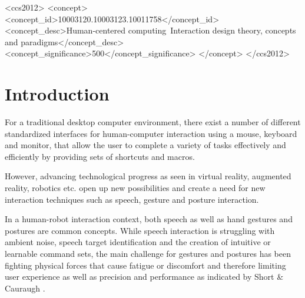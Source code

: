 \documentclass{sig-alternate-05-2015}
\begin{document}
%
%
\begin{CCSXML}
<ccs2012>
<concept>
<concept_id>10003120.10003123.10011758</concept_id>
<concept_desc>Human-centered computing~Interaction design theory, concepts and paradigms</concept_desc>
<concept_significance>500</concept_significance>
</concept>
</ccs2012>
\end{CCSXML}






%
%

%
%
\printccsdesc



\section{Introduction}

For a traditional desktop computer environment, there exist a number of different standardized interfaces for human-computer interaction using a mouse, keyboard and monitor, that allow the user to 
complete a variety of tasks effectively and efficiently by providing sets of shortcuts and macros. 

However, advancing technological progress as seen in virtual reality, augmented reality,
 robotics etc. open up new possibilities and create a need for new interaction techniques such as speech, gesture and posture interaction. 

In a human-robot interaction context, both speech as well as hand gestures and postures are common concepts. While speech interaction is struggling 
with ambient noise, speech target identification and the creation of intuitive or learnable command sets, the main challenge for gestures and postures has been fighting physical forces that cause fatigue or discomfort and therefore limiting user experience as well as precision and performance as indicated by Short \& Cauraugh \cite{short1999precision}.
\end{document}
